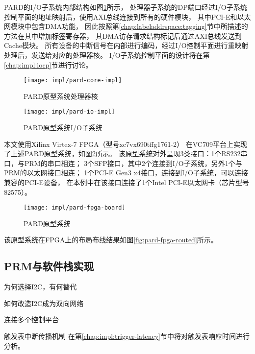 PARD的I/O子系统内部结构如图\ref{fig:pard-io-impl}所示，
处理器子系统的DP端口经过I/O子系统控制平面的地址映射后，使用AXI总线连接到所有的硬件模块，
其中PCI-E和以太网模块中包含DMA功能，
因此按照第\ref{chap:labeladdrspace:tagging}节中所描述的方法在其中增加标签寄存器，
其DMA访存请求结构标记后通过AXI总线发送到Cache模块。
所有设备的中断信号在内部进行编码，经过I/O控制平面进行重映射处理后，发送给对应的处理器核。
I/O子系统控制平面的设计将在第\ref{chap:impl:iocp}节进行讨论。

\begin{figure}[tb]
\begin{minipage}{0.48\textwidth}
  \centering
  \texttt{[image: impl/pard-core-impl]}
  \caption{PARD原型系统处理器核}
  \label{fig:pard-core-impl}
\end{minipage}\hfill
\begin{minipage}{0.48\textwidth}
  \centering
  \texttt{[image: impl/pard-io-impl]}
  \caption{PARD原型系统I/O子系统}
  \label{fig:pard-io-impl}
\end{minipage}
\end{figure}

本文使用Xilinx Virtex-7 FPGA（型号xc7vx690tffg1761-2）
在VC709平台上实现了上述PARD原型系统，如图\ref{fig:pard-fpga-board}所示。
该原型系统对外呈现3类接口：1个RS232串口，与PRM的串口相连；
3个SFP接口，其中2个连接到I/O子系统，另外1个与PRM的以太网接口相连；
1个PCI-E Gen3 x4接口，连接到I/O子系统，可以连接兼容的PCI-E设备，
在本例中在该接口连接了1个Intel PCI-E以太网卡（芯片型号82575）。

\begin{figure}[tb]
  \centering
  \texttt{[image: impl/pard-fpga-board]}
  \caption{PARD原型系统}
  \label{fig:pard-fpga-board}
\end{figure}

该原型系统在FPGA上的布局布线结果如图\ref{fig:pard-fpga-routed}所示。



\subsection{PRM与软件栈实现}

为何选择I2C，有何替代

如何改造I2C成为双向网络

连接多个控制平台

触发表中断传播机制
在第\ref{chap:impl:trigger-latency}节中将对触发表响应时间进行分析。


